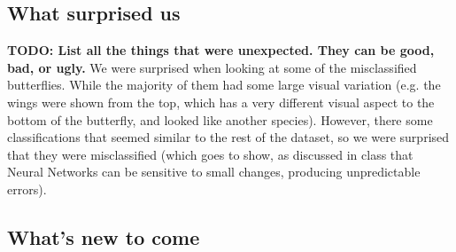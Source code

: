 \documentclass[10pt]{article} %
\begin{document}
\subsection{What surprised us}
\textbf{TODO: List all the things that were unexpected. They can be good, bad, or ugly.}
We were surprised when looking at some of the misclassified butterflies. While the majority of them had some large visual variation (e.g. the wings were shown from the top, which has a very different visual aspect to the bottom of the butterfly, and looked like another species). However, there some classifications that seemed similar to the rest of the dataset, so we were surprised that they were misclassified (which goes to show, as discussed in class that Neural Networks can be sensitive to small changes, producing unpredictable errors).
\subsection{What's new to come}
\end{document}
